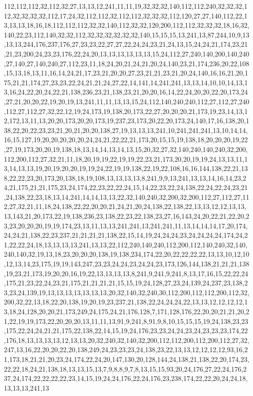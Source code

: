 112,112,112,32,112,32,27,13,13,12,241,11,11,19,32,32,32,140,112,112,240,32,32,32,112,32,32,32,32,112,17,24,32,112,112,32,112,112,32,32,32,112,120,27,27,140,112,22,13,13,13,18,16,18,112,112,112,32,32,140,112,32,32,120,200,112,112,32,32,32,18,16,32,140,22,23,112,140,32,32,112,32,32,32,32,32,32,140,15,15,15,13,241,13,87,244,10,9,13,13,13,244,176,237,176,27,23,23,22,27,27,22,24,24,23,21,24,13,15,24,24,21,174,23,21,21,23,200,24,23,23,176,22,24,20,13,13,13,13,13,13,15,24,112,27,240,140,200,140,240,27,140,27,140,240,27,112,23,11,18,24,20,21,24,21,20,24,140,23,21,174,236,20,22,108,15,13,18,13,11,16,14,24,21,17,23,21,20,20,27,23,21,21,23,21,20,24,140,16,16,21,20,175,21,21,174,27,23,23,22,24,21,21,24,27,22,14,141,14,241,241,13,13,14,10,10,14,13,13,16,24,22,20,24,22,21,138,236,23,21,138,23,21,20,20,16,14,22,24,20,20,22,20,173,24,27,21,20,20,22,19,20,19,13,241,11,11,13,13,15,24,112,140,240,240,112,27,112,27,240,112,27,112,27,32,22,12,19,24,173,19,138,20,173,22,27,20,20,20,21,173,19,23,14,13,12,172,13,11,13,20,20,173,20,20,173,19,237,23,173,20,22,20,173,24,140,17,16,138,20,138,22,20,22,23,23,21,20,21,20,20,138,27,19,13,13,13,241,10,241,241,241,13,10,14,14,16,15,127,19,20,20,20,20,20,24,24,21,22,22,21,173,20,15,15,19,138,18,20,20,20,19,22,27,19,173,20,20,19,138,18,13,14,14,13,14,13,15,20,32,27,32,140,240,140,240,32,200,112,200,112,27,32,21,11,18,20,19,19,22,19,19,22,23,21,173,20,20,19,19,24,13,13,11,13,14,13,13,19,20,19,20,20,19,19,24,22,19,19,138,22,19,22,108,16,16,144,138,22,21,138,22,22,23,20,173,20,138,18,19,108,13,13,13,13,8,241,9,9,13,241,13,13,14,16,14,23,24,21,175,21,21,175,23,24,174,22,23,22,22,24,15,14,22,23,22,24,138,22,24,22,24,23,21,24,138,22,23,18,13,14,241,14,14,13,13,22,32,140,240,32,200,32,200,112,27,112,27,112,27,32,21,11,18,24,138,22,22,20,20,21,24,21,20,24,138,22,138,22,13,13,12,12,13,13,13,143,21,20,173,22,19,138,236,23,138,22,23,22,138,23,27,16,143,24,20,22,21,22,20,23,23,20,20,20,19,19,174,23,13,11,13,13,241,241,13,241,241,11,13,14,14,14,17,20,174,24,24,21,138,22,23,237,21,21,21,21,138,22,15,14,19,24,24,24,23,24,24,24,24,174,24,21,22,22,24,18,13,13,13,13,241,13,13,22,112,240,140,240,112,200,112,140,240,32,140,240,140,32,19,13,18,23,20,20,20,138,19,138,234,174,22,20,22,22,22,22,13,13,10,12,10,12,13,14,23,175,19,19,143,247,23,23,24,24,23,24,24,23,173,126,144,138,21,21,21,138,19,23,21,173,19,20,20,16,19,22,13,13,13,13,8,241,9,241,9,241,8,13,17,16,15,22,22,24,175,21,23,22,24,23,21,175,21,21,21,21,15,15,19,24,128,27,23,24,139,24,237,23,138,23,23,24,139,19,13,13,13,13,13,13,13,20,32,140,32,240,30,112,200,112,112,200,112,32,200,32,22,13,18,22,20,138,19,20,19,23,237,21,138,22,24,24,24,22,13,13,12,12,12,12,13,18,24,128,20,20,21,173,249,24,175,24,21,176,128,7,171,128,176,22,20,20,21,21,20,21,22,19,19,173,22,20,20,20,13,11,11,13,91,9,241,8,91,9,8,10,15,15,15,19,24,138,23,23,175,22,24,24,21,21,175,22,138,22,14,15,19,24,176,23,23,24,24,23,24,23,23,23,174,22,176,18,13,13,13,13,12,13,13,20,32,240,32,140,32,200,112,112,200,112,200,112,27,32,247,13,16,22,20,20,22,20,138,249,24,23,23,23,24,138,23,22,13,13,12,12,12,12,93,16,21,173,18,21,21,20,23,24,174,22,24,20,147,130,20,128,144,24,138,21,138,22,20,174,23,22,22,18,24,21,138,18,13,13,15,13,7,9,8,8,9,7,8,13,15,15,93,20,24,176,27,22,24,176,237,24,174,22,22,22,22,23,14,15,19,24,24,176,22,24,176,23,238,174,22,22,20,24,24,18,13,13,13,241,13